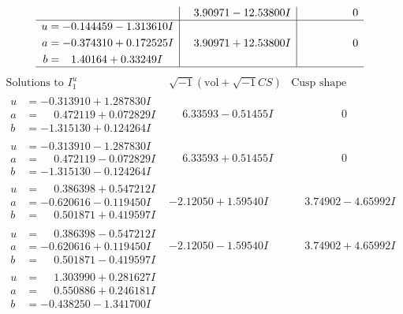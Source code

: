 \documentclass[1p]{elsarticle_modified}
\theoremstyle{definition}
\newcommand{\I}{\sqrt{-1}}
\begin{document}
$$\begin{array}{c|c|c}
 & \phantom{-}3.90971 - 12.53800 I & \phantom{-0.000000 } 0 \\ \hline\begin{aligned}
u &= -0.144459 - 1.313610 I \\
a &= -0.374310 + 0.172525 I \\
b &= \phantom{-}1.40164 + 0.33249 I\end{aligned}
 & \phantom{-}3.90971 + 12.53800 I & \phantom{-0.000000 } 0\\
 \hline 
 \end{array}$$\newpage$$\begin{array}{c|c|c}  
\text{Solutions to }I^u_{1}& \I (\text{vol} + \sqrt{-1}CS) & \text{Cusp shape}\\
 \hline 
\begin{aligned}
u &= -0.313910 + 1.287830 I \\
a &= \phantom{-}0.472119 + 0.072829 I \\
b &= -1.315130 + 0.124264 I\end{aligned}
 & \phantom{-}6.33593 - 0.51455 I & \phantom{-0.000000 } 0 \\ \hline\begin{aligned}
u &= -0.313910 - 1.287830 I \\
a &= \phantom{-}0.472119 - 0.072829 I \\
b &= -1.315130 - 0.124264 I\end{aligned}
 & \phantom{-}6.33593 + 0.51455 I & \phantom{-0.000000 } 0 \\ \hline\begin{aligned}
u &= \phantom{-}0.386398 + 0.547212 I \\
a &= -0.620616 - 0.119450 I \\
b &= \phantom{-}0.501871 + 0.419597 I\end{aligned}
 & -2.12050 + 1.59540 I & \phantom{-}3.74902 - 4.65992 I \\ \hline\begin{aligned}
u &= \phantom{-}0.386398 - 0.547212 I \\
a &= -0.620616 + 0.119450 I \\
b &= \phantom{-}0.501871 - 0.419597 I\end{aligned}
 & -2.12050 - 1.59540 I & \phantom{-}3.74902 + 4.65992 I \\ \hline\begin{aligned}
u &= \phantom{-}1.303990 + 0.281627 I \\
a &= \phantom{-}0.550886 + 0.246181 I \\
b &= -0.438250 - 1.341700 I\end{aligned}

\end{array}$$
\end{document}

